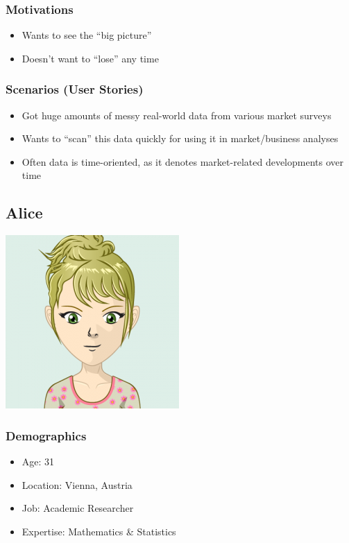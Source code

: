 \subsubsection{Motivations}

\begin{itemize}
    \item Wants to see the ``big picture''
    \item Doesn't want to ``lose'' any time
\end{itemize}

\subsubsection{Scenarios (User Stories)}

\begin{itemize}
    \item Got huge amounts of messy real-world data from various market surveys
    \item Wants to ``scan'' this data quickly for using it in market/business analyses
    \item Often data is time-oriented, as it denotes market-related developments over time
\end{itemize}


\subsection{Alice}

\includegraphics[scale=0.5]{figures/requirements/persona-avatar-alice}

\subsubsection{Demographics}

\begin{itemize}
    \item Age: 31
    \item Location: Vienna, Austria
    \item Job: Academic Researcher
    \item Expertise: Mathematics \& Statistics
\end{itemize}

